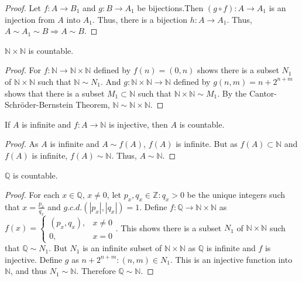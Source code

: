\documentclass[crop=false,class=article,oneside]{standalone}
\begin{document}
        \begin{proof}
        Let $f:A\rightarrow B_1$ and $g:B\rightarrow A_1$ be bijections.Then $(g\circ f):A\rightarrow A_1$ is an injection from $A$ into $A_1$. Thus, there is a bijection $h:A\rightarrow A_1$. Thus, $A\sim A_1 \sim B\Rightarrow A\sim B$.
        \end{proof}
        \begin{theorem}
        $\mathbb{N}\times \mathbb{N}$ is countable.
        \end{theorem}
        \begin{proof}
        For $f:\mathbb{N} \rightarrow \mathbb{N}\times \mathbb{N}$ defined by $f(n) = (0,n)$ shows there is a subset $N_1$ of $\mathbb{N} \times \mathbb{N}$ such that $\mathbb{N}\sim N_1$. And $g:\mathbb{N}\times \mathbb{N} \rightarrow \mathbb{N}$ defined by $g(n,m) =n+2^{n+m}$ shows that there is a subset $M_1 \subset \mathbb{N}$ such that $\mathbb{N} \times \mathbb{N} \sim M_1$. By the Cantor-Schr\"{o}der-Bernstein Theorem, $\mathbb{N} \sim \mathbb{N}\times \mathbb{N}$.
        \end{proof}
        \begin{lemma}
        If $A$ is infinite and $f:A\rightarrow \mathbb{N}$ is injective, then $A$ is countable.
        \end{lemma}
        \begin{proof}
        As $A$ is infinite and $A\sim f(A)$, $f(A)$ is infinite. But as $f(A)\subset \mathbb{N}$ and $f(A)$ is infinite, $f(A)\sim \mathbb{N}$. Thus, $A\sim \mathbb{N}$. 
        \end{proof}
        \begin{theorem}
        $\mathbb{Q}$ is countable.
        \end{theorem}
        \begin{proof}
        For each $x\in \mathbb{Q}$, $x\ne 0$, let $p_x,q_x\in\mathbb{Z}:q_x>0$ be the unique integers such that $x = \frac{p_x}{q_x}$ and $g.c.d.(|p_x|,|q_x|)=1$. Define $f:\mathbb{Q}\rightarrow \mathbb{N}\times \mathbb{N}$ as $f(x) = \begin{cases}(p_x,q_x), & x\ne 0 \\ 0, & x=0\end{cases}$. This shows there is a subset $N_1$ of $\mathbb{N}\times \mathbb{N}$ such that $\mathbb{Q}\sim N_1$. But $N_1$ is an infinite subset of $\mathbb{N}\times\mathbb{N}$ as $\mathbb{Q}$ is infinite and $f$ is injective. Define $g$ as $n+2^{n+m}:(n,m)\in N_1$. This is an injective function into $\mathbb{N}$, and thus $N_1 \sim \mathbb{N}$. Therefore $\mathbb{Q}\sim \mathbb{N}$.
        \end{proof}
\end{document}
